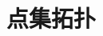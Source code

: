 \documentclass[9pt]{book}
\begin{document}
	\setcounter{page}{1}
	
	\part{点集拓扑}
	
	

	
\end{document}
